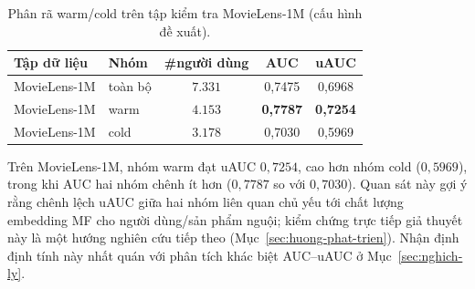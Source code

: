 \begin{table}[ht]
\caption{Phân rã warm/cold trên tập kiểm tra MovieLens-1M (cấu hình đề xuất).}
\label{tab:warm-cold}
\begin{center}
\begin{tabular}{|L{2.6cm}|L{2.4cm}|c|c|c|}
\hline
\textbf{Tập dữ liệu} & \textbf{Nhóm} & \textbf{\#người dùng} & \textbf{AUC} & \textbf{uAUC} \\
\hline
MovieLens-1M & toàn bộ & $7{.}331$ & 0{,}7475 & 0{,}6968 \\
\hline
MovieLens-1M & warm & $4{.}153$ & \textbf{0{,}7787} & \textbf{0{,}7254} \\
\hline
MovieLens-1M & cold & $3{.}178$ & 0{,}7030 & 0{,}5969 \\
\hline
\end{tabular}
\end{center}
\end{table}

Trên MovieLens-1M, nhóm warm đạt uAUC $0{,}7254$, cao hơn nhóm cold ($0{,}5969$), trong khi AUC
hai nhóm chênh ít hơn ($0{,}7787$ so với $0{,}7030$). Quan sát này gợi ý rằng chênh lệch uAUC
giữa hai nhóm liên quan chủ yếu tới chất lượng embedding MF cho người dùng/sản phẩm nguội; kiểm
chứng trực tiếp giả thuyết này là một hướng nghiên cứu tiếp theo
(Mục~\ref{sec:huong-phat-trien}). Nhận định định tính này nhất quán với phân tích khác biệt
AUC--uAUC ở Mục~\ref{sec:nghich-ly}.

